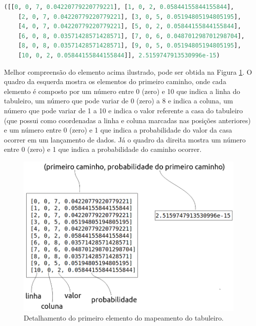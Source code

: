 \documentclass[12pt]{article}
\begin{document}
\begin{lstlisting}[language=Python]
([[0, 0, 7, 0.04220779220779221], [1, 0, 2, 0.05844155844155844], 
	[2, 0, 7, 0.04220779220779221], [3, 0, 5, 0.05194805194805195],
	[4, 0, 7, 0.04220779220779221], [5, 0, 2, 0.05844155844155844], 
	[6, 0, 8, 0.03571428571428571], [7, 0, 6, 0.048701298701298704], 
	[8, 0, 8, 0.03571428571428571], [9, 0, 5, 0.05194805194805195], 
	[10, 0, 2, 0.05844155844155844]], 2.5159747913530996e-15)
\end{lstlisting}

%

Melhor compreensão do elemento acima ilustrado, pode ser obtida na Figura \ref{explicacao_primeiro_elemento_mapeado}. O quadro da esquerda mostra os elementos do primeiro caminho, onde cada elemento é composto por um número entre 0 (zero) e 10 que indica a linha do tabuleiro, um número que pode variar de 0 (zero) a 8 e indica a coluna, um número que pode variar de 1 a 10 e indica o valor referente a casa do tabuleiro (que possui como coordenadas a linha e coluna marcadas nas posições anteriores) e um número entre 0 (zero) e 1 que indica a probabilidade do valor da casa ocorrer em um lançamento de dados. Já o quadro da direita mostra um número entre 0 (zero) e 1 que indica a probabilidade do caminho ocorrer.

\begin{figure}[ht!]
	\centering
	\includegraphics[width=0.8\linewidth]{img/explicacao_primeiro_elemento_mapeado.png}
	\caption{Detalhamento do primeiro elemento do mapeamento do tabuleiro.}
	\label{explicacao_primeiro_elemento_mapeado}
\end{figure}
\end{document}
